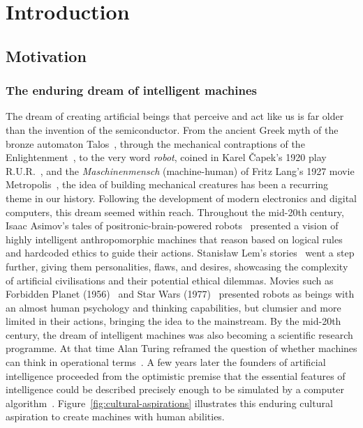 \chapter{Introduction}

\section{Motivation}

\subsection{The enduring dream of intelligent machines}

The dream of creating artificial beings that perceive and act like us is far older than the invention of the semiconductor.
From the ancient Greek myth of the bronze automaton Talos~\cite{mayor2018gods},
through the mechanical contraptions of the Enlightenment~\cite{riskin2003defecating,voskuhl2013androids},
to the very word \emph{robot}, coined in Karel Čapek's 1920 play R.U.R.~\cite{capek1920rur},
and the \emph{Maschinenmensch} (machine-human) of Fritz Lang's 1927 movie Metropolis~\cite{lang1927metropolis},
the idea of building mechanical creatures has been a recurring theme in our history.
Following the development of modern electronics and digital computers, this dream seemed within reach.
Throughout the mid-20th century, Isaac Asimov's tales of positronic-brain-powered robots~\cite{asimov1950irobot}
presented a vision of highly intelligent anthropomorphic machines that reason based on logical rules and hardcoded ethics to guide their actions. 
Stanisław Lem's stories~\cite{lem1965cyberiada} went a step further, giving them personalities, flaws, and desires,
showcasing the complexity of artificial civilisations and their potential ethical dilemmas.
Movies such as Forbidden Planet (1956)~\cite{wilcox1956forbidden} and Star Wars (1977)~\cite{lucas1977starwars}
presented robots as beings with an almost human psychology and thinking capabilities, but clumsier and more limited in their actions, bringing the idea to the mainstream. By the mid-20th century, the dream of intelligent machines was also becoming a
scientific research programme. At that time Alan Turing reframed the question of whether machines can think in operational terms~\cite{turing1950computing}. A few years later the founders of artificial intelligence proceeded from the optimistic premise that the
essential features of intelligence could be described precisely enough to be
simulated by a computer algorithm~\cite{mccarthy1955proposal}. Figure~\ref{fig:cultural-aspirations} illustrates this enduring cultural aspiration to create machines with human abilities.

